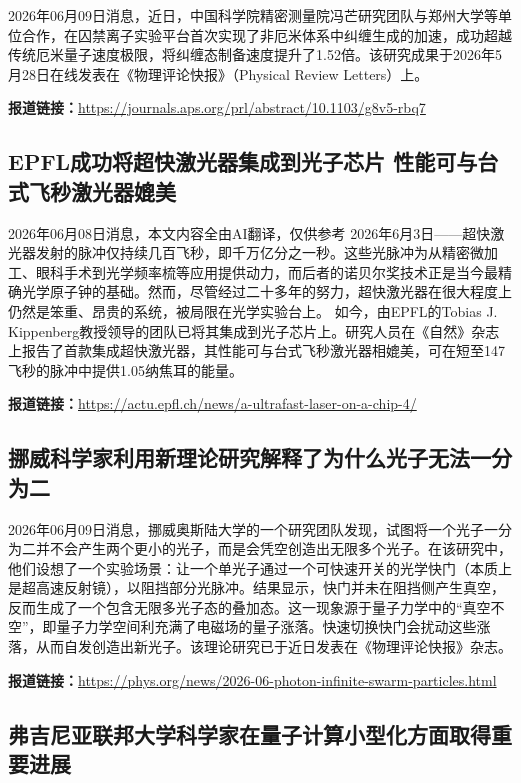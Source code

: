 \documentclass[12pt,a4paper]{ctexart}
\begin{document}
2026年06月09日消息，近日，中国科学院精密测量院冯芒研究团队与郑州大学等单位合作，在囚禁离子实验平台首次实现了非厄米体系中纠缠生成的加速，成功超越传统厄米量子速度极限，将纠缠态制备速度提升了1.52倍。该研究成果于2026年5月28日在线发表在《物理评论快报》（Physical Review Letters）上。

\noindent\textbf{报道链接：}\url{https://journals.aps.org/prl/abstract/10.1103/g8v5-rbq7}

\subsection{ EPFL成功将超快激光器集成到光子芯片 性能可与台式飞秒激光器媲美 }

2026年06月08日消息，本文内容全由AI翻译，仅供参考
2026年6月3日——超快激光器发射的脉冲仅持续几百飞秒，即千万亿分之一秒。这些光脉冲为从精密微加工、眼科手术到光学频率梳等应用提供动力，而后者的诺贝尔奖技术正是当今最精确光学原子钟的基础。然而，尽管经过二十多年的努力，超快激光器在很大程度上仍然是笨重、昂贵的系统，被局限在光学实验台上。
如今，由EPFL的Tobias J. Kippenberg教授领导的团队已将其集成到光子芯片上。研究人员在《自然》杂志上报告了首款集成超快激光器，其性能可与台式飞秒激光器相媲美，可在短至147飞秒的脉冲中提供1.05纳焦耳的能量。

\noindent\textbf{报道链接：}\url{https://actu.epfl.ch/news/a-ultrafast-laser-on-a-chip-4/}

\subsection{ 挪威科学家利用新理论研究解释了为什么光子无法一分为二 }

2026年06月09日消息，挪威奥斯陆大学的一个研究团队发现，试图将一个光子一分为二并不会产生两个更小的光子，而是会凭空创造出无限多个光子。在该研究中，他们设想了一个实验场景：让一个单光子通过一个可快速开关的光学快门（本质上是超高速反射镜），以阻挡部分光脉冲。结果显示，快门并未在阻挡侧产生真空，反而生成了一个包含无限多光子态的叠加态。这一现象源于量子力学中的“真空不空”，即量子力学空间利充满了电磁场的量子涨落。快速切换快门会扰动这些涨落，从而自发创造出新光子。该理论研究已于近日发表在《物理评论快报》杂志。

\noindent\textbf{报道链接：}\url{https://phys.org/news/2026-06-photon-infinite-swarm-particles.html}

\subsection{ 弗吉尼亚联邦大学科学家在量子计算小型化方面取得重要进展 }
\end{document}

